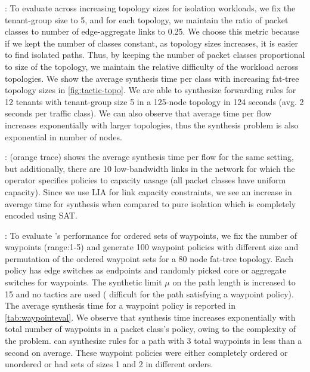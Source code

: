 : To evaluate \Name across
increasing topology sizes for isolation workloads, we fix the
tenant-group size to 5, and for each topology, we maintain the ratio
of packet classes to number of edge-aggregate links to 0.25.  We
choose this metric because if we kept the number of classes constant,
as topology sizes increases, it is easier to find isolated
paths. Thus, by keeping the number of packet classes proportional to
size of the topology, we maintain the relative difficulty of the
workload across topologies.  We show the average synthesis time per
class with increasing fat-tree topology sizes in
\cref{fig:tactic-topo}.  We are able to synthesize forwarding rules
for 12 tenants with tenant-group size 5 in a 125-node topology in 124
seconds (avg. 2 seconds per traffic class).
We can also observe that average time per flow increases exponentially
with larger topologies, thus the synthesis problem is also exponential
in number of nodes.
  
  
 : 
 (orange trace) shows the average synthesis time per flow for the same setting, but
 additionally, there are 10 low-bandwidth links in the network for which the operator
 specifies policies to capacity uasage (all packet classes have uniform capacity). 
Since we use LIA for link capacity constraints, we see an 
increase in average time for synthesis 
when compared to pure isolation which is completely 
encoded using SAT. 

: To evaluate \Name's performance for
ordered sets of waypoints, we fix the number of waypoints (range:1-5)
and generate 100 waypoint policies with different size and permutation
of the ordered waypoint sets for a 80 node fat-tree topology. Each
policy has edge switches as endpoints and randomly picked core or
aggregate switches for waypoints. The synthetic limit $\mu$ on the
path length is increased to 15 and no tactics are used (
difficult for the path satisfying a waypoint policy). The
average synthesis time for a waypoint policy is reported in
\cref{tab:waypointeval}.  We observe that synthesis time increases
exponentially with total number of waypoints in a packet class's
policy, owing to the complexity of the problem.  \Name can synthesize
rules for a path with 3 total waypoints in less than a second on
average. These waypoint policies were either completely ordered or
unordered or had sets of sizes 1 and 2 in different
orders. 


